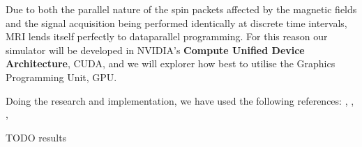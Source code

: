 
Due to both the parallel nature of the spin packets affected by the
magnetic fields and the signal acquisition being performed identically
at discrete time intervals, MRI lends itself perfectly to dataparallel
programming. For this reason our simulator will be developed in
NVIDIA's \textbf{Compute Unified Device Architecture}, CUDA, and we
will explorer how best to utilise the Graphics Programming Unit, GPU.


Doing the research and implementation, we have used the following
references: \cite{HaackeBook99}, \cite{feeman}, \cite{aibinu-mri}, \cite{benoit2005simri}

TODO results

